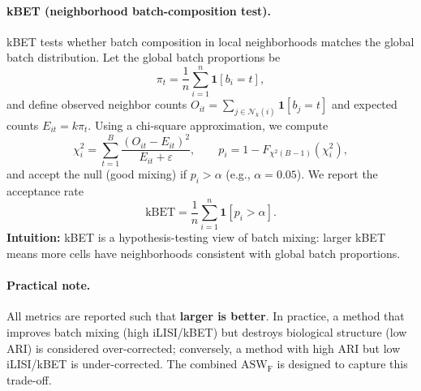\paragraph{kBET (neighborhood batch-composition test).}
kBET tests whether batch composition in local neighborhoods matches the global batch distribution.
Let the global batch proportions be
\begin{equation}
  \pi_t = \frac{1}{n}\sum_{i=1}^n \mathbf{1}[b_i=t],
\end{equation}
and define observed neighbor counts $O_{it}=\sum_{j\in\mathcal{N}_k(i)}\mathbf{1}[b_j=t]$ and expected counts $E_{it}=k\pi_t$.
Using a chi-square approximation, we compute
\begin{equation}
  \chi_i^2 = \sum_{t=1}^B \frac{(O_{it}-E_{it})^2}{E_{it}+\varepsilon},\qquad p_i = 1 - F_{\chi^2(B-1)}(\chi_i^2),
\end{equation}
and accept the null (good mixing) if $p_i>\alpha$ (e.g., $\alpha=0.05$).
We report the acceptance rate
\begin{equation}
  \mathrm{kBET} = \frac{1}{n}\sum_{i=1}^n \mathbf{1}[p_i>\alpha].
\end{equation}
\textbf{Intuition:} kBET is a hypothesis-testing view of batch mixing: larger kBET means more cells have neighborhoods consistent with global batch proportions.

\paragraph{Practical note.}
All metrics are reported such that \textbf{larger is better}. In practice, a method that improves batch mixing (high iLISI/kBET) but destroys biological structure (low ARI) is considered over-corrected; conversely, a method with high ARI but low iLISI/kBET is under-corrected. The combined $\mathrm{ASW}_{\mathrm{F}}$ is designed to capture this trade-off.
